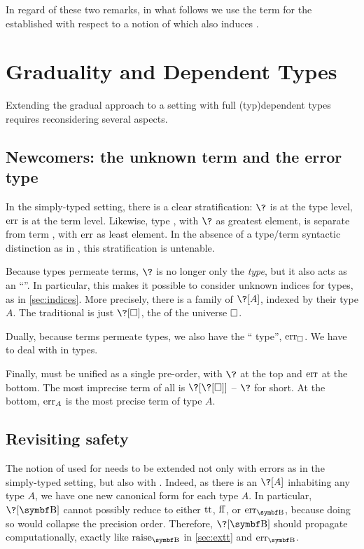 In regard of these two remarks, in what follows we use the term 
for the  established with respect to a notion of  which also
induces .

\section{Graduality and Dependent Types}
\label{sec:graduality}

Extending the gradual approach to a setting with full \kl(typ){dependent} types
requires reconsidering several aspects.

\subsection{Newcomers: the unknown term and the error type}
%
In the simply-typed setting, there is a clear stratification: $\?$ is at the type level,
$\err$ is at the term level. Likewise, type , with $\?$ as greatest element,
is separate from term , with $\err$ as least element.
In the absence of a type/term syntactic distinction as in ,
this stratification is untenable.

Because types permeate terms, $\?$ is no longer only the  \emph{type},
but it also acts as an “”.
In particular, this makes it possible to consider unknown indices for types,
as in \cref{sec:indices}.
More precisely, there is a family of  $\?[A]$, indexed by their type $A$.
The traditional  is just $\?[\uni]$, the  of the universe $\uni$.

Dually, because terms permeate types, we also have the “ type”, $\err[\uni]$.
We have to deal with  in types.

Finally,  must be unified as a single pre-order, with $\?$ at the top
and $\err$ at the bottom.
The most imprecise term of all%
is $\?[\?[\uni]]$ – $\?$ for short. At the bottom, $\err[A]$
is the most precise term of type $A$.

\subsection{Revisiting safety}

The notion of  used for  needs to be extended not
only with errors as in the simply-typed setting, but also with .
Indeed, as there is an  $\?[A]$ inhabiting any type
$A$, we have one new canonical form for each type $A$. In particular,
$\?[\Bool]$ cannot possibly reduce to either $\operatorname{tt}$, $\operatorname{ff}$, or $\err[\Bool]$,
because doing so would collapse the precision order.
%
Therefore, $\?[\Bool]$ should propagate computationally, exactly
like $\rai[\Bool]$ in \cref{sec:extt} and $\err[\Bool]$.
%

